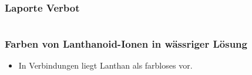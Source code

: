 \documentclass{beamer}
\begin{document}
  \begin{frame}[t]\frametitle{Laporte Verbot}

\end{frame}
\section{}
  \begin{frame}[t]\frametitle{Farben von Lanthanoid-Ionen in wässriger Lösung}
\begin{itemize}
  \item In Verbindungen liegt Lanthan als farbloses  vor.
\end{itemize}

\end{frame}
\end{document}
